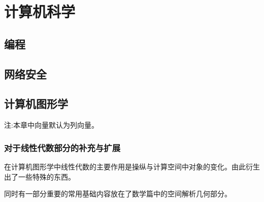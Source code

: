 \documentclass[UTF8]{ctexbook}
\begin{document}
\chapter{计算机科学}{

  \section{编程}{


   }%

  \section{网络安全}{


   }%

  \section{计算机图形学}{
    注:本章中向量默认为列向量。

    \subsection{对于线性代数部分的补充与扩展}{

      在计算机图形学中线性代数的主要作用是操纵与计算空间中对象的变化。由此衍生出了一些特殊的东西。

      同时有一部分重要的常用基础内容放在了数学篇中的空间解析几何部分。

}}}
\end{document}
